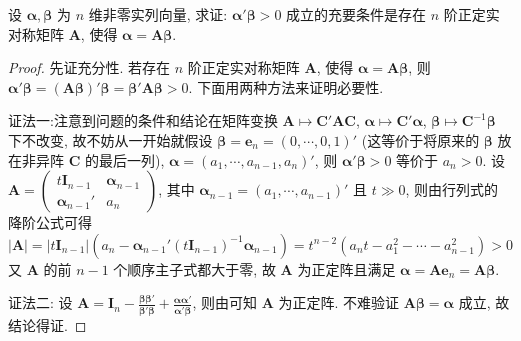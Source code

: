 \documentclass[../../main.tex]{subfiles}
\begin{document}
\begin{proposition}
设 \(\boldsymbol{\alpha},\boldsymbol{\beta}\) 为 \(n\) 维非零实列向量, 求证: \(\boldsymbol{\alpha}'\boldsymbol{\beta}>0\) 成立的充要条件是存在 \(n\) 阶正定实对称矩阵 \(\boldsymbol{A}\), 使得 \(\boldsymbol{\alpha}=\boldsymbol{A}\boldsymbol{\beta}\).
\end{proposition}
\begin{proof}
先证充分性. 若存在 \(n\) 阶正定实对称矩阵 \(\boldsymbol{A}\), 使得 \(\boldsymbol{\alpha}=\boldsymbol{A}\boldsymbol{\beta}\), 则 \(\boldsymbol{\alpha}'\boldsymbol{\beta}=(\boldsymbol{A}\boldsymbol{\beta})'\boldsymbol{\beta}=\boldsymbol{\beta}'\boldsymbol{A}\boldsymbol{\beta}>0\). 下面用两种方法来证明必要性.

{\color{blue}证法一:}注意到问题的条件和结论在矩阵变换 \(\boldsymbol{A}\mapsto\boldsymbol{C}'\boldsymbol{A}\boldsymbol{C}\), \(\boldsymbol{\alpha}\mapsto\boldsymbol{C}'\boldsymbol{\alpha}\), \(\boldsymbol{\beta}\mapsto\boldsymbol{C}^{-1}\boldsymbol{\beta}\) 下不改变, 故不妨从一开始就假设 \(\boldsymbol{\beta}=\boldsymbol{e}_n=(0,\cdots,0,1)'\) (这等价于将原来的 \(\boldsymbol{\beta}\) 放在非异阵 \(\boldsymbol{C}\) 的最后一列), \(\boldsymbol{\alpha}=(a_1,\cdots,a_{n - 1},a_n)'\), 则 \(\boldsymbol{\alpha}'\boldsymbol{\beta}>0\) 等价于 \(a_n>0\). 设 \(\boldsymbol{A}=\begin{pmatrix}t\boldsymbol{I}_{n - 1}&\boldsymbol{\alpha}_{n - 1}\\\boldsymbol{\alpha}_{n - 1}'&a_n\end{pmatrix}\), 其中 \(\boldsymbol{\alpha}_{n - 1}=(a_1,\cdots,a_{n - 1})'\) 且 \(t\gg0\), 则由行列式的降阶公式可得
\[|\boldsymbol{A}|=|t\boldsymbol{I}_{n - 1}|(a_n-\boldsymbol{\alpha}_{n - 1}'(t\boldsymbol{I}_{n - 1})^{-1}\boldsymbol{\alpha}_{n - 1})=t^{n - 2}(a_nt - a_1^2-\cdots - a_{n - 1}^2)>0\]
又 \(\boldsymbol{A}\) 的前 \(n - 1\) 个顺序主子式都大于零, 故 \(\boldsymbol{A}\) 为正定阵且满足 \(\boldsymbol{\alpha}=\boldsymbol{A}\boldsymbol{e}_n=\boldsymbol{A}\boldsymbol{\beta}\).

{\color{blue}证法二:} 设 \(\boldsymbol{A}=\boldsymbol{I}_n-\frac{\boldsymbol{\beta}\boldsymbol{\beta}'}{\boldsymbol{\beta}'\boldsymbol{\beta}}+\frac{\boldsymbol{\alpha}\boldsymbol{\alpha}'}{\boldsymbol{\alpha}'\boldsymbol{\beta}}\), 则由可知 \(\boldsymbol{A}\) 为正定阵. 不难验证 \(\boldsymbol{A}\boldsymbol{\beta}=\boldsymbol{\alpha}\) 成立, 故结论得证.
\end{proof}
\end{document}
